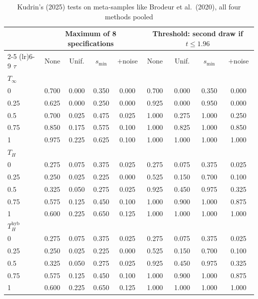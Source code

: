 \begin{table}[htbp]
\centering
\caption{Kudrin's (2025) tests on meta-samples like Brodeur et al.\ (2020), all four methods pooled}
\label{tab:brodeur_all_power_kudrin}
\footnotesize
\setlength{\tabcolsep}{4pt}
\begin{tabular}{lcccccccc}
\toprule
 & \multicolumn{4}{c}{Maximum of 8 specifications} & \multicolumn{4}{c}{Threshold: second draw if $t \le 1.96$} \\
\cmidrule(lr){2-5} \cmidrule(lr){6-9}
$\tau$ & None & Unif. & $s_{\min}$ & $+$noise & None & Unif. & $s_{\min}$ & $+$noise \\
\midrule
\multicolumn{9}{l}{\textit{$T_\infty$}} \\
0 & 0.700 & 0.000 & 0.350 & 0.000 & 0.700 & 0.000 & 0.350 & 0.000 \\
0.25 & 0.625 & 0.000 & 0.250 & 0.000 & 0.925 & 0.000 & 0.950 & 0.000 \\
0.5 & 0.700 & 0.025 & 0.475 & 0.025 & 1.000 & 0.275 & 1.000 & 0.250 \\
0.75 & 0.850 & 0.175 & 0.575 & 0.100 & 1.000 & 0.825 & 1.000 & 0.850 \\
1 & 0.975 & 0.225 & 0.625 & 0.100 & 1.000 & 1.000 & 1.000 & 1.000 \\
\midrule
\multicolumn{9}{l}{\textit{$T_H$}} \\
0 & 0.275 & 0.075 & 0.375 & 0.025 & 0.275 & 0.075 & 0.375 & 0.025 \\
0.25 & 0.250 & 0.025 & 0.225 & 0.000 & 0.525 & 0.150 & 0.700 & 0.100 \\
0.5 & 0.325 & 0.050 & 0.275 & 0.025 & 0.925 & 0.450 & 0.975 & 0.325 \\
0.75 & 0.575 & 0.125 & 0.450 & 0.100 & 1.000 & 0.900 & 1.000 & 0.875 \\
1 & 0.600 & 0.225 & 0.650 & 0.125 & 1.000 & 1.000 & 1.000 & 1.000 \\
\midrule
\multicolumn{9}{l}{\textit{$T_H^{\mathrm{hyb}}$}} \\
0 & 0.275 & 0.075 & 0.375 & 0.025 & 0.275 & 0.075 & 0.375 & 0.025 \\
0.25 & 0.250 & 0.025 & 0.225 & 0.000 & 0.525 & 0.150 & 0.700 & 0.100 \\
0.5 & 0.325 & 0.050 & 0.275 & 0.025 & 0.925 & 0.450 & 0.975 & 0.325 \\
0.75 & 0.575 & 0.125 & 0.450 & 0.100 & 1.000 & 0.900 & 1.000 & 0.875 \\
1 & 0.600 & 0.225 & 0.650 & 0.125 & 1.000 & 1.000 & 1.000 & 1.000 \\
\bottomrule

\end{tabular}
\end{table}
